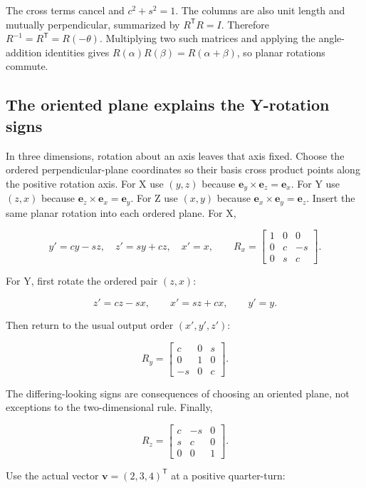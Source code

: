 The cross terms cancel and \(c^2+s^2=1\). The columns are also unit length and mutually perpendicular, summarized by \(R^{\mathsf T}R=I\). Therefore \(R^{-1}=R^{\mathsf T}=R(-\theta)\). Multiplying two such matrices and applying the angle-addition identities gives \(R(\alpha)R(\beta)=R(\alpha+\beta)\), so planar rotations commute.

\subsection{The oriented plane explains the Y-rotation signs}\label{01-foundations-i-ch018-the-oriented-plane-explains-the-y-rotation-signs}

In three dimensions, rotation about an axis leaves that axis fixed. Choose the ordered perpendicular-plane coordinates so their basis cross product points along the positive rotation axis. For X use \((y,z)\) because \(\mathbf e_y\times\mathbf e_z=\mathbf e_x\). For Y use \((z,x)\) because \(\mathbf e_z\times\mathbf e_x=\mathbf e_y\). For Z use \((x,y)\) because \(\mathbf e_x\times\mathbf e_y=\mathbf e_z\). Insert the same planar rotation into each ordered plane. For X,

\[
y'=cy-sz,\quad z'=sy+cz,\quad x'=x,
\qquad
R_x=\begin{bmatrix}1&0&0\\0&c&-s\\0&s&c\end{bmatrix}.
\]

For Y, first rotate the ordered pair \((z,x)\):

\[
z'=cz-sx,\qquad x'=sz+cx,\qquad y'=y.
\]

Then return to the usual output order \((x',y',z')\):

\[
R_y=\begin{bmatrix}c&0&s\\0&1&0\\-s&0&c\end{bmatrix}.
\]

The differing-looking signs are consequences of choosing an oriented plane, not exceptions to the two-dimensional rule. Finally,

\[
R_z=\begin{bmatrix}c&-s&0\\s&c&0\\0&0&1\end{bmatrix}.
\]

Use the actual vector \(\mathbf v=(2,3,4)^{\mathsf T}\) at a positive quarter-turn:


